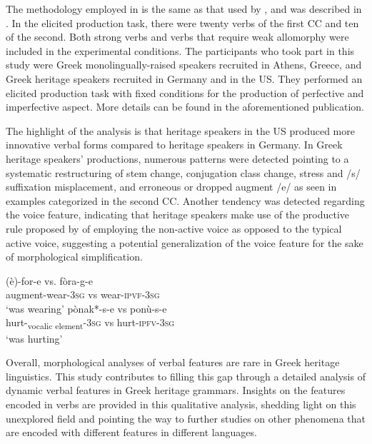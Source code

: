 \documentclass[output=paper,colorlinks,citecolor=brown]{langscibook}
\begin{document}
The methodology employed in \textcite{novelforms} is the same as that used by \textcite{rizou2021verbal}, and was described in . In the elicited production task, there were twenty verbs of the first CC and ten of the second. Both strong verbs and verbs that require weak allomorphy were included in the experimental conditions. The participants who took part in this study were Greek monolingually-raised speakers recruited in Athens, Greece, and Greek heritage speakers recruited in Germany and in the US. They performed an elicited production task with fixed conditions for the production of perfective and imperfective aspect. More details can be found in the aforementioned publication.

The highlight of the analysis is that heritage speakers in the US produced more innovative verbal forms compared to heritage speakers in Germany. In Greek heritage speakers' productions, numerous patterns were detected pointing to a systematic restructuring of stem change, conjugation class change, stress and /s/ suffixation misplacement, and erroneous or dropped augment /e/ as seen in examples  categorized in the second CC. Another tendency was detected regarding the voice feature, indicating that heritage speakers make use of the productive rule proposed by \textcite{oikonomou2022voice} of employing the non-active voice as opposed to the typical active voice, suggesting a potential generalization of the voice feature for the sake of morphological simplification.

\ea \label{novel_examples_rizou}
 \ex \gll *(è)-for-e vs. fòra-g-e\\
 \hphantom{*}augment-wear-\textsc{3sg} vs wear-\textsc{ipvf-3sg}\\
 \glt `was wearing' 
 \ex \gll pònak*-s-e vs ponù-s-e \\
 hurt-\textsubscript{vocalic element}-\textsc{3sg} vs hurt-\textsc{ipfv-3sg} \\
 \glt `was hurting' 
 \z
 
Overall, morphological analyses of verbal features are rare in Greek heritage linguistics. This study contributes to filling this gap through a detailed analysis of dynamic verbal features in Greek heritage grammars. Insights on the features encoded in verbs are provided in this qualitative analysis, shedding light on this unexplored field and pointing the way to further studies on other phenomena that are encoded with different features in different languages.
\end{document}
